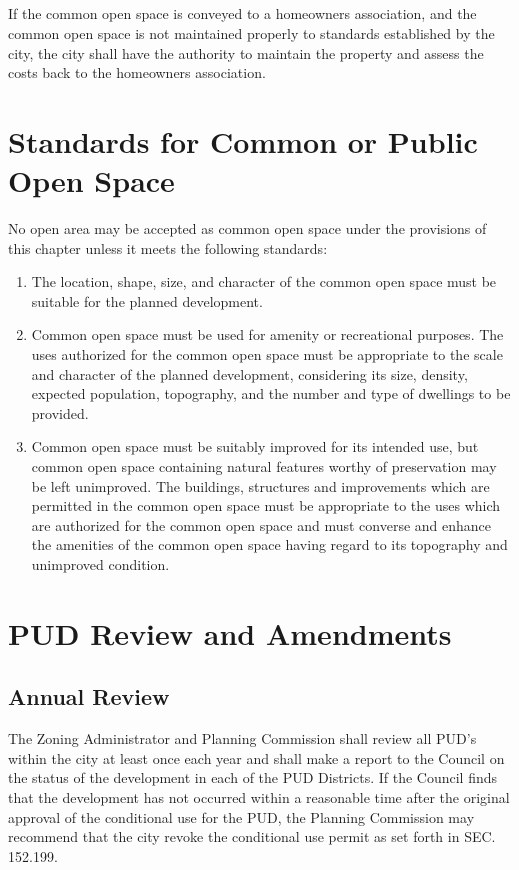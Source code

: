 \subsection{}
If the common open space is conveyed to a homeowners association, and the common open space is not maintained properly to standards established by the city, the city shall have the authority to maintain the property and assess the costs back to the homeowners association.

\section{Standards for Common or Public Open Space}
No open area may be accepted as common open space under the provisions of this chapter unless it meets the following standards:
\begin{enumerate}[{\indent}A)]
    \item The location, shape, size, and character of the common open space must be suitable for the planned development.
    \item Common open space must be used for amenity or recreational purposes. The uses authorized for the common open space must be appropriate to the scale and character of the planned development, considering its size, density, expected population, topography, and the number and type of dwellings to be provided.
    \item Common open space must be suitably improved for its intended use, but common open space containing natural features worthy of preservation may be left unimproved. The buildings, structures and improvements which are permitted in the common open space must be appropriate to the uses which are authorized for the common open space and must converse and enhance the amenities of the common open space having regard to its topography and unimproved condition.
\end{enumerate}

\section{PUD Review and Amendments}
\subsection{Annual Review}
The Zoning Administrator and Planning Commission shall review all PUD’s within the city at least once each year and shall make a report to the Council on the status of the development in each of the PUD Districts. If the Council finds that the development has not occurred within a reasonable time after the original approval of the conditional use for the PUD, the Planning Commission may recommend that the city revoke the conditional use permit as set forth in SEC. 152.199.
